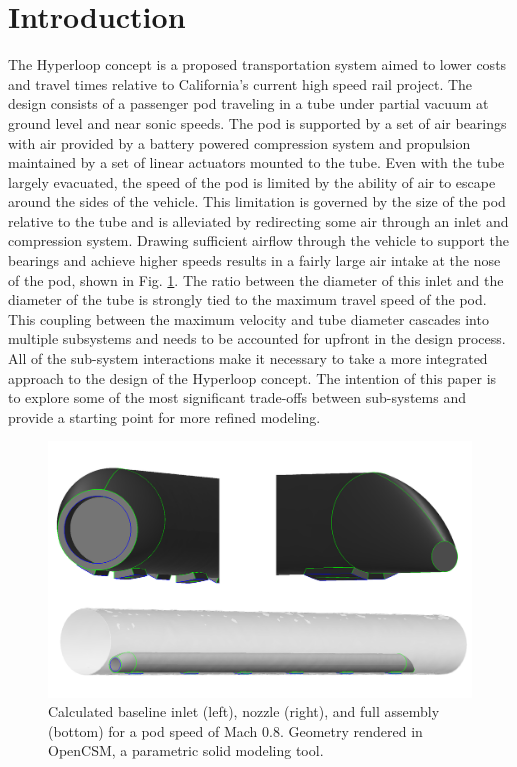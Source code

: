 \documentclass[heading.tex]{subfiles}
\begin{document}
\section{Introduction}

The Hyperloop concept is a proposed transportation system aimed to lower costs and travel times relative to California's current high speed
 rail project. \cite{Musk} The design consists of a passenger pod traveling in a tube under partial vacuum at ground level and near sonic
speeds. The pod is supported by a set of air bearings with air provided by a battery powered compression system and propulsion maintained
by a set of linear actuators mounted to the tube. Even with the tube largely evacuated, the speed of the pod is limited by the ability of air to
escape around the sides of the vehicle. This limitation is governed by the size of the pod relative to the tube and is alleviated by redirecting some air
through an inlet and compression system. Drawing sufficient airflow through the vehicle to support the bearings and achieve higher speeds results
in a fairly large air intake at the nose of the pod, shown in Fig. \ref{f:hyperloopCAD}. The ratio between the diameter of this inlet and the diameter of the
tube is strongly tied to the maximum travel speed of the pod. This coupling between the maximum velocity and
tube diameter cascades into multiple subsystems and needs to be accounted for upfront in the design process. 
All of the sub-system interactions make it necessary to take a more integrated approach to the design of the Hyperloop concept. The intention of
this paper is to explore some of the most significant trade-offs between sub-systems and provide a starting point for more refined modeling.

\begin{figure}[hbtp]
\centering
\includegraphics[width=\textwidth]{images/hyperloop_cad.png}
 \caption[Hyperloop geometry assembled in OpenCSM]{Calculated baseline inlet (left), nozzle (right), and full assembly (bottom) for a pod speed of Mach 0.8. Geometry rendered in OpenCSM, a parametric solid modeling tool.}
\label{f:hyperloopCAD}
\end{figure}
\end{document}
